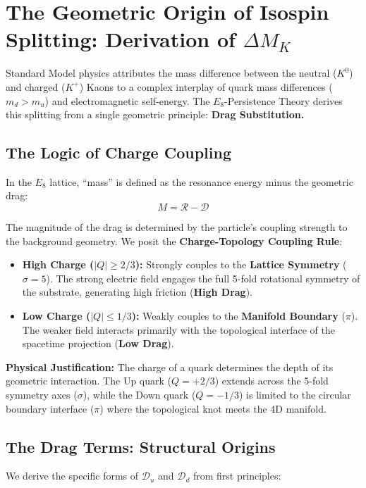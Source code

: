 \section*{The Geometric Origin of Isospin Splitting: Derivation of \texorpdfstring{$\Delta M_K$}{DeltaMK}}

Standard Model physics attributes the mass difference between the neutral ($K^0$) and charged ($K^+$) Kaons to a complex interplay of quark mass differences ($m_d > m_u$) and electromagnetic self-energy. The $E_8$-Persistence Theory derives this splitting from a single geometric principle: \textbf{Drag Substitution.}

\subsection*{The Logic of Charge Coupling}
In the $E_8$ lattice, ``mass'' is defined as the resonance energy minus the geometric drag:
\begin{equation}
    M = \mathcal{R} - \mathcal{D}
\end{equation}

The magnitude of the drag is determined by the particle's coupling strength to the background geometry. We posit the \textbf{Charge-Topology Coupling Rule}:

\begin{itemize}
    \item \textbf{High Charge ($|Q| \ge 2/3$):} Strongly couples to the \textbf{Lattice Symmetry} ($\sigma=5$). The strong electric field engages the full 5-fold rotational symmetry of the substrate, generating high friction (\textbf{High Drag}).
    \item \textbf{Low Charge ($|Q| \le 1/3$):} Weakly couples to the \textbf{Manifold Boundary} ($\pi$). The weaker field interacts primarily with the topological interface of the spacetime projection (\textbf{Low Drag}).
\end{itemize}

\textbf{Physical Justification:} The charge of a quark determines the depth of its geometric interaction. The Up quark ($Q=+2/3$) extends across the 5-fold symmetry axes ($\sigma$), while the Down quark ($Q=-1/3$) is limited to the circular boundary interface ($\pi$) where the topological knot meets the 4D manifold.

\subsection*{The Drag Terms: Structural Origins}
We derive the specific forms of $\mathcal{D}_u$ and $\mathcal{D}_d$ from first principles:

